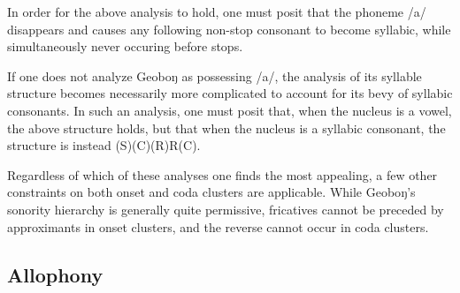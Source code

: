\documentclass[10pt]{article}
\newcommand{\chris}[1]{{\Charis #1}}
\newcommand{\ipa}[1]{/\chris{#1}/}
\newcommand{\engma}{ŋ}
\begin{document}
In order for the above analysis to hold, one must posit that the phoneme \ipa{a} disappears and causes any following non-stop consonant to become syllabic, while simultaneously never occuring before stops.

If one does not analyze Geobo{\engma} as possessing \ipa{a}, the analysis of its syllable structure becomes necessarily more complicated to account for its bevy of syllabic consonants. In such an analysis, one must posit that, when the nucleus is a vowel, the above structure holds, but that when the nucleus is a syllabic consonant, the structure is instead (S)(C)(R)R(C).

Regardless of which of these analyses one finds the most appealing, a few other constraints on both onset and coda clusters are applicable. While Geobo{\engma}'s sonority hierarchy is generally quite permissive, fricatives cannot be preceded by approximants in onset clusters, and the reverse cannot occur in coda clusters.

\subsection{Allophony}
\end{document}
